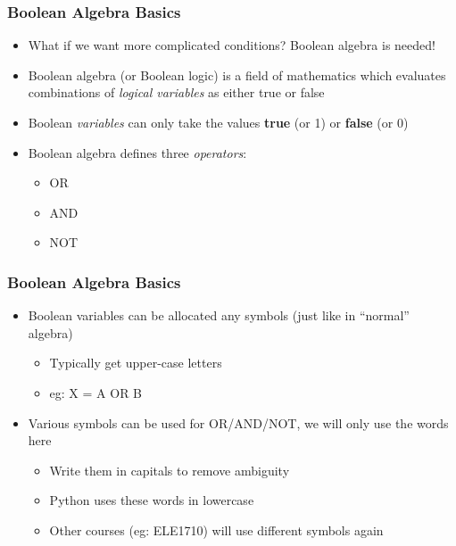 \documentclass[14pt]{beamer}
\begin{document}
\begin{frame} %
\frametitle{Boolean Algebra Basics}
\begin{itemize}
\item What if we want more complicated conditions? Boolean algebra is needed!
\item Boolean algebra (or Boolean logic) is a field of mathematics which evaluates combinations of \textit{logical variables} as either true or false
\item Boolean \textit{variables} can only take the values \textbf{true} (or 1) or \textbf{false} (or 0)
\item Boolean algebra defines three \textit{operators}:
	\begin{itemize}
		\item OR
		\item AND
		\item NOT
	\end{itemize}
\end{itemize}
\end{frame}

\begin{frame} %
\frametitle{Boolean Algebra Basics}
\begin{itemize}
\item Boolean variables can be allocated any symbols (just like in ``normal'' algebra)
	\begin{itemize}
		\item Typically get upper-case letters
		\item eg: X = A OR B
	\end{itemize}
\item Various symbols can be used for OR/AND/NOT, we will only use the words here
	\begin{itemize}
		\item Write them in capitals to remove ambiguity
		\item Python uses these words in lowercase
		\item Other courses (eg: ELE1710) will use different symbols again
	\end{itemize}
\end{itemize}
\end{frame}
\end{document}
